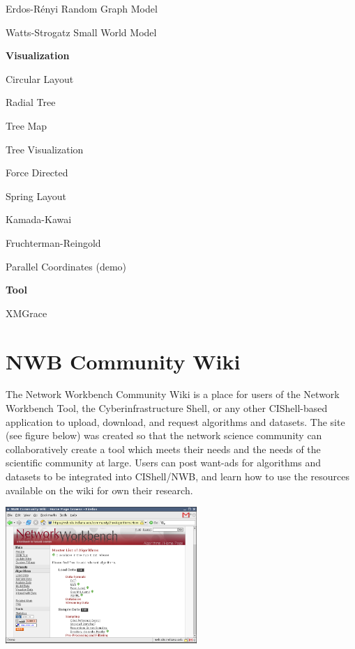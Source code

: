 \begin{multicols}{2}
{\begin{tiny}
\begin{list}{}{\setlength{\itemindent}{-7mm}\setlength{\itemsep}{0mm}\setlength{\topsep}{1mm}}
\item Erdos-R\'{e}nyi Random Graph Model
\item Watts-Strogatz Small World Model
\end{list}
\textbf{Visualization}
\begin{list}{}{\setlength{\itemindent}{-7mm}\setlength{\itemsep}{0mm}\setlength{\topsep}{1mm}}
\item Circular Layout
\item Radial Tree
\item Tree Map
\item Tree Visualization
\item Force Directed
\item Spring Layout
\item Kamada-Kawai
\item Fruchterman-Reingold
\item Parallel Coordinates (demo)
\end{list}
\textbf{Tool}
\begin{list}{}{\setlength{\itemindent}{-7mm}\setlength{\itemsep}{0mm}\setlength{\topsep}{1mm}}
\item XMGrace
\item 
\item 
\end{list}
\end{tiny}
}
\end{multicols}



\section{NWB Community Wiki}

The Network Workbench Community Wiki \cite{nwbCommunityWiki} is a place for 
users of the Network Workbench Tool, the Cyberinfrastructure Shell, or any 
other CIShell-based application to upload, download, and request algorithms and 
datasets. The site (see figure below) was created so that the network science 
community can collaboratively create a tool which meets their needs and the 
needs of the scientific community at large. Users can post want-ads for 
algorithms and datasets to be integrated into CIShell/NWB, and learn how to use 
the resources available on the wiki for own their research.

\begin{center}
\includegraphics[width=2.85in]{nwb-graphics/nwbWiki.png}
\end{center}